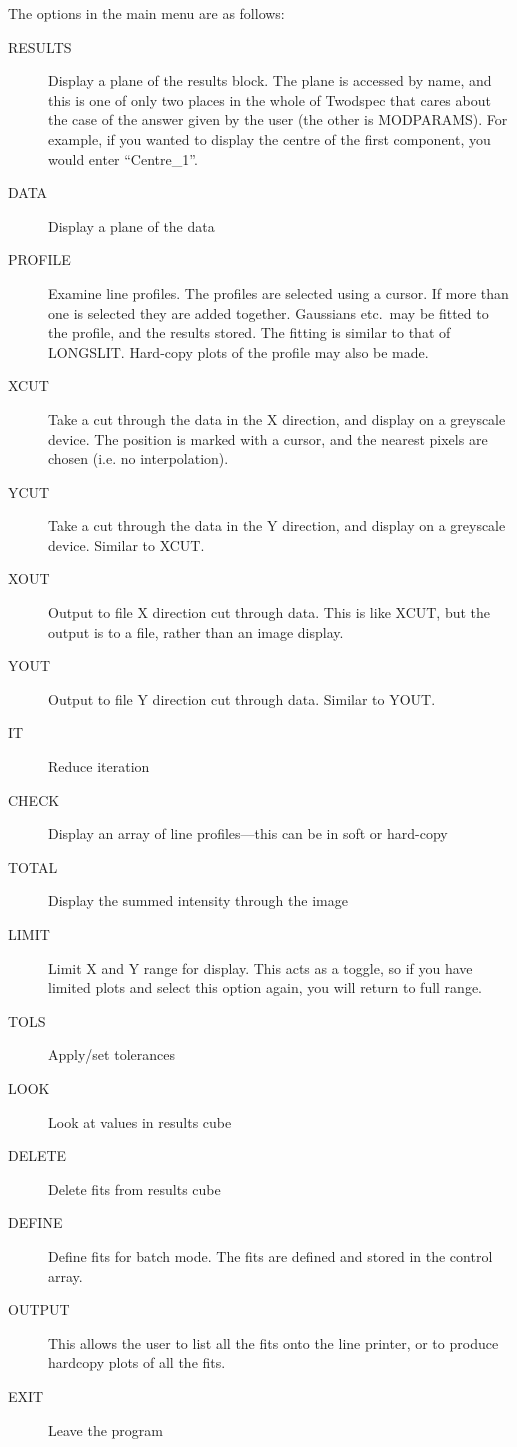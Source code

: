 \documentclass[11pt,twoside]{article}
\begin{document}
The options in the main menu are as follows:
\begin{description}
\item[RESULTS] Display a plane of the results block.
The plane is accessed by name, and this is one of only two places in the
whole of Twodspec that cares about the case of the answer given by the
user (the other is MODPARAMS).
For example, if you wanted to display the centre of the first component,
you would enter ``Centre\_1''.
\item[DATA] Display a plane of the data
\item[PROFILE] Examine line profiles.
The profiles are selected using a cursor.
If more than one is selected they are added together. Gaussians  etc.\
may be fitted to the profile, and the results stored.
The fitting is similar to that of LONGSLIT.
Hard-copy plots of the profile may also be made.
\item[XCUT] Take a cut through the data in the X direction, and
display on a greyscale device.
The position is marked with a cursor, and the nearest pixels are chosen
(i.e. no interpolation).
\item[YCUT] Take a cut through the data in the Y direction, and
display on a greyscale device.
Similar to XCUT.
\item[XOUT] Output to file X direction cut through data.
This is like XCUT, but the output is to a file, rather than an image
display.
\item[YOUT] Output to file Y direction cut through data.
Similar to YOUT.
\item[IT] Reduce iteration
\item[CHECK] Display an array of line profiles---this can be in soft
or hard-copy
\item[TOTAL] Display the summed intensity through the image
\item[LIMIT] Limit X and Y range for display.
This acts as a toggle, so if you have limited plots and select this
option again, you will return to full range.
\item[TOLS] Apply/set tolerances
\item[LOOK] Look at values in results cube
\item[DELETE] Delete fits from results cube
\item[DEFINE] Define fits for batch mode. The fits are defined and
stored in the control array.
\item[OUTPUT] This allows the user to list all the fits onto the
line printer, or to produce hardcopy plots of all the fits.
\item[EXIT] Leave the program

\end{description}
\end{document}
